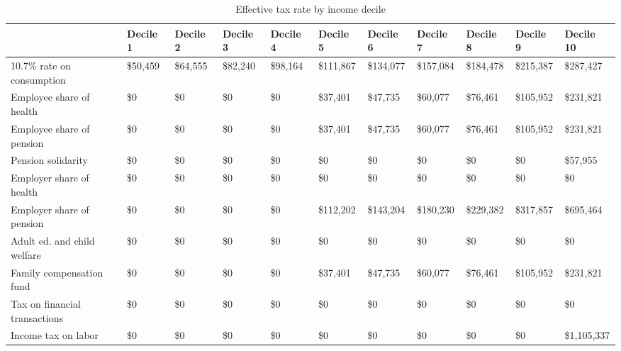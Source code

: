 \documentclass[12pt]{article}
\begin{document}
\begin{landscape}
\begin{table}[]
\caption{Effective tax rate by income decile}
\label{tab:tdecile}
\footnotesize
\begin{tabular}{lllllllllll} \hline
& Decile 1                                              & Decile 2  & Decile 3  & Decile 4  & Decile 5    & Decile 6    & Decile 7    & Decile 8    & Decile 9    & Decile 10                \\ \hline
10.7\% rate on consumption              & \$50,459  & \$64,555  & \$82,240  & \$98,164    & \$111,867   & \$134,077   & \$157,084   & \$184,478   & \$215,387   & \$287,427    \\
Employee share of health                              & \$0       & \$0       & \$0       & \$0         & \$37,401    & \$47,735    & \$60,077    & \$76,461    & \$105,952   & \$231,821    \\
Employee share of pension                             & \$0       & \$0       & \$0       & \$0         & \$37,401    & \$47,735    & \$60,077    & \$76,461    & \$105,952   & \$231,821    \\
Pension solidarity                                    & \$0       & \$0       & \$0       & \$0         & \$0         & \$0         & \$0         & \$0         & \$0         & \$57,955     \\
Employer share of health                              & \$0       & \$0       & \$0       & \$0         & \$0         & \$0         & \$0         & \$0         & \$0         & \$0          \\
Employer share of pension                             & \$0       & \$0       & \$0       & \$0         & \$112,202   & \$143,204   & \$180,230   & \$229,382   & \$317,857   & \$695,464    \\
Adult ed. and child welfare                     & \$0       & \$0       & \$0       & \$0         & \$0         & \$0         & \$0         & \$0         & \$0         & \$0          \\
Family compensation fund                              & \$0       & \$0       & \$0       & \$0         & \$37,401    & \$47,735    & \$60,077    & \$76,461    & \$105,952   & \$231,821    \\
Tax on financial transactions                         & \$0       & \$0       & \$0       & \$0         & \$0         & \$0         & \$0         & \$0         & \$0         & \$0          \\
Income tax on labor                                   & \$0       & \$0       & \$0       & \$0         & \$0         & \$0         & \$0         & \$0         & \$0         & \$1,105,337  \\

\end{tabular}
\end{table}
\end{landscape}
\end{document}
